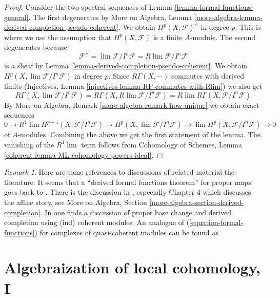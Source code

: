 \documentclass{stacks-project}
\theoremstyle{plain}
\theoremstyle{definition}
\theoremstyle{remark}
\newtheorem{remark}[subsection]{Remark}
\numberwithin{equation}{subsection}
\def\lim{\mathop{\mathrm{lim}}\nolimits}
\begin{document}
\begin{proof}
Consider the two spectral sequences of
Lemma \ref{lemma-formal-functions-general}.
The first degenerates by More on Algebra, Lemma
\ref{more-algebra-lemma-derived-completion-pseudo-coherent}.
We obtain $H^p(X, \mathcal{F})^\wedge$ in degree $p$.
This is where we use the assumption that $H^p(X, \mathcal{F})$ is
a finite $A$-module. The second degenerates because
$$
\mathcal{F}^\wedge = \lim \mathcal{F}/I^n\mathcal{F} =
R\lim \mathcal{F}/I^n\mathcal{F}
$$
is a sheaf by Lemma \ref{lemma-derived-completion-pseudo-coherent}.
We obtain $H^p(X, \lim \mathcal{F}/I^n\mathcal{F})$ in degree $p$.
Since $R\Gamma(X, -)$ commutes with derived limits
(Injectives, Lemma \ref{injectives-lemma-RF-commutes-with-Rlim})
we also get
$$
R\Gamma(X, \lim \mathcal{F}/I^n\mathcal{F}) =
R\Gamma(X, R\lim \mathcal{F}/I^n\mathcal{F}) =
R\lim R\Gamma(X, \mathcal{F}/I^n\mathcal{F})
$$
By More on Algebra, Remark
\ref{more-algebra-remark-how-unique}
we obtain exact sequences
$$
0 \to
R^1\lim H^{p - 1}(X, \mathcal{F}/I^n\mathcal{F}) \to
H^p(X, \lim \mathcal{F}/I^n\mathcal{F}) \to
\lim H^p(X, \mathcal{F}/I^n\mathcal{F}) \to 0
$$
of $A$-modules. Combining the above we get the first statement of the lemma.
The vanishing of the $R^1\lim$ term follows from
Cohomology of Schemes, Lemma \ref{coherent-lemma-ML-cohomology-powers-ideal}.
\end{proof}

\begin{remark}
\label{remark-references}
Here are some references to discussions of related material the literature.
It seems that a ``derived formal functions theorem'' for proper maps
goes back to \cite[Theorem 6.3.1]{lurie-thesis}.
There is the discussion in \cite{dag12}, especially
Chapter 4 which discusses the affine story, see
More on Algebra, Section \ref{more-algebra-section-derived-completion}.
In \cite[Section 2.9]{G-R} one finds a discussion of proper base change and
derived completion using (ind) coherent modules.
An analogue of (\ref{equation-formal-functions})
for complexes of quasi-coherent modules can be found as
\cite[Theorem 6.5]{HL-P}
\end{remark}







\section{Algebraization of local cohomology, I}
\label{section-algebraization-sections-general}
\end{document}
